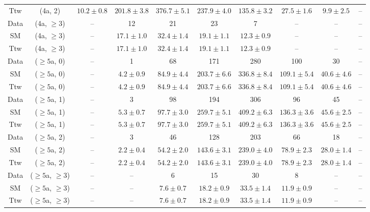 \begin{table}[h!]
{\begin{tabular}{cccccccccc}
	Ttw & (4a, 2) & $10.2\pm 0.8$ & $201.8\pm 3.8$ & $376.7\pm 5.1$ & $237.9\pm 4.0$ & $135.8\pm 3.2$ & $27.5\pm 1.6$ & $9.9\pm 2.5$ & -- \\[0.5ex] 
	Data & (4a, $\ge3$) & -- & 12 & 21 & 23 & 7 & -- & -- & -- \\[0.5ex] 
	SM & (4a, $\ge3$) & -- & $17.1\pm 1.0$ & $32.4\pm 1.4$ & $19.1\pm 1.1$ & $12.3\pm 0.9$ & -- & -- & -- \\[0.5ex] 
	Ttw & (4a, $\ge3$) & -- & $17.1\pm 1.0$ & $32.4\pm 1.4$ & $19.1\pm 1.1$ & $12.3\pm 0.9$ & -- & -- & -- \\[0.5ex] 
	Data & ($\ge5$a, 0) & -- & 1 & 68 & 171 & 280 & 100 & 30 & -- \\[0.5ex] 
	SM & ($\ge5$a, 0) & -- & $4.2\pm 0.9$ & $84.9\pm 4.4$ & $203.7\pm 6.6$ & $336.8\pm 8.4$ & $109.1\pm 5.4$ & $40.6\pm 4.6$ & -- \\[0.5ex] 
	Ttw & ($\ge5$a, 0) & -- & $4.2\pm 0.9$ & $84.9\pm 4.4$ & $203.7\pm 6.6$ & $336.8\pm 8.4$ & $109.1\pm 5.4$ & $40.6\pm 4.6$ & -- \\[0.5ex] 
	Data & ($\ge5$a, 1) & -- & 3 & 98 & 194 & 306 & 96 & 45 & -- \\[0.5ex] 
	SM & ($\ge5$a, 1) & -- & $5.3\pm 0.7$ & $97.7\pm 3.0$ & $259.7\pm 5.1$ & $409.2\pm 6.3$ & $136.3\pm 3.6$ & $45.6\pm 2.5$ & -- \\[0.5ex] 
	Ttw & ($\ge5$a, 1) & -- & $5.3\pm 0.7$ & $97.7\pm 3.0$ & $259.7\pm 5.1$ & $409.2\pm 6.3$ & $136.3\pm 3.6$ & $45.6\pm 2.5$ & -- \\[0.5ex] 
	Data & ($\ge5$a, 2) & -- & 3 & 46 & 128 & 203 & 66 & 18 & -- \\[0.5ex] 
	SM & ($\ge5$a, 2) & -- & $2.2\pm 0.4$ & $54.2\pm 2.0$ & $143.6\pm 3.1$ & $239.0\pm 4.0$ & $78.9\pm 2.3$ & $28.0\pm 1.4$ & -- \\[0.5ex] 
	Ttw & ($\ge5$a, 2) & -- & $2.2\pm 0.4$ & $54.2\pm 2.0$ & $143.6\pm 3.1$ & $239.0\pm 4.0$ & $78.9\pm 2.3$ & $28.0\pm 1.4$ & -- \\[0.5ex] 
	Data & ($\ge5$a, $\ge3$) & -- & -- & 6 & 15 & 30 & 8 & -- & -- \\[0.5ex] 
	SM & ($\ge5$a, $\ge3$) & -- & -- & $7.6\pm 0.7$ & $18.2\pm 0.9$ & $33.5\pm 1.4$ & $11.9\pm 0.9$ & -- & -- \\[0.5ex] 
	Ttw & ($\ge5$a, $\ge3$) & -- & -- & $7.6\pm 0.7$ & $18.2\pm 0.9$ & $33.5\pm 1.4$ & $11.9\pm 0.9$ & -- & -- \\[0.5ex] 
	\hline
	\hline
\end{tabular}}
\end{table}
